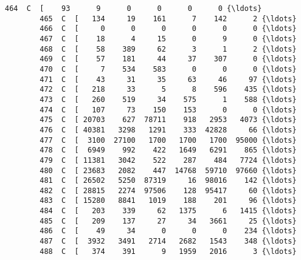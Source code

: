 \documentclass[11pt]{article}
\begin{document}
\begin{Verbatim}[commandchars=\\\{\}]
        464  C  [    93      9      0      0      0      0 {\ldots}   
        465  C  [   134     19    161      7    142      2 {\ldots}   
        466  C  [     0      0      0      0      0      0 {\ldots}   
        467  C  [    18      4     15      0      9      0 {\ldots}   
        468  C  [    58    389     62      3      1      2 {\ldots}   
        469  C  [    57    181     44     37    307      0 {\ldots}   
        470  C  [     7    534    583      0      0      0 {\ldots}   
        471  C  [    43     31     35     63     46     97 {\ldots}   
        472  C  [   218     33      5      8    596    435 {\ldots}   
        473  C  [   260    519     34    575      1    588 {\ldots}   
        474  C  [   107     73    150    153      0      0 {\ldots}   
        475  C  [ 20703    627  78711    918   2953   4073 {\ldots}   
        476  C  [ 40381   3298   1291    333  42828     66 {\ldots}   
        477  C  [  3100  27100   1700   1700   1700  95000 {\ldots}   
        478  C  [  6949    992    422   1649   6291    865 {\ldots}   
        479  C  [ 11381   3042    522    287    484   7724 {\ldots}   
        480  C  [ 23683   2082    447  14768  59710  97660 {\ldots}   
        481  C  [ 26502   5250  87319     16  98016    142 {\ldots}   
        482  C  [ 28815   2274  97506    128  95417     60 {\ldots}   
        483  C  [ 15280   8841   1019    188    201     96 {\ldots}   
        484  C  [   203    339     62   1375      6   1415 {\ldots}   
        485  C  [   209    137     27     34   3661     25 {\ldots}   
        486  C  [    49     34      0      0      0    234 {\ldots}   
        487  C  [  3932   3491   2714   2682   1543    348 {\ldots}   
        488  C  [   374    391      9   1959   2016      3 {\ldots}   
        

\end{Verbatim}
\end{document}
